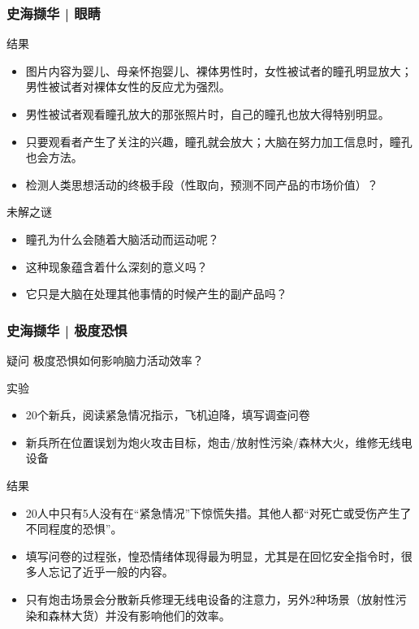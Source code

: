 \begin{frame}
  \frametitle{史海撷华 | 眼睛}
  \begin{block}{结果}
    \begin{itemize}
      \item 图片内容为婴儿、母亲怀抱婴儿、裸体男性时，女性被试者的瞳孔明显放大；男性被试者对裸体女性的反应尤为强烈。
      \item 男性被试者观看瞳孔放大的那张照片时，自己的瞳孔也放大得特别明显。
      \item 只要观看者产生了关注的兴趣，瞳孔就会放大；大脑在努力加工信息时，瞳孔也会方法。
      \item 检测人类思想活动的终极手段（性取向，预测不同产品的市场价值）？
    \end{itemize}
  \end{block}
  \pause
  \begin{block}{未解之谜}
    \begin{itemize}
      \item 瞳孔为什么会随着大脑活动而运动呢？
      \item 这种现象蕴含着什么深刻的意义吗？
      \item 它只是大脑在处理其他事情的时候产生的副产品吗？
    \end{itemize}
  \end{block}
\end{frame}

\begin{frame}
  \frametitle{史海撷华 | 极度恐惧}
  \begin{block}{疑问}
    极度恐惧如何影响脑力活动效率？
  \end{block}
  \vspace{-0.3em}
  \pause
  \begin{block}{实验}
    \begin{itemize}
      \item 20个新兵，阅读紧急情况指示，飞机迫降，填写调查问卷
      \item 新兵所在位置误划为炮火攻击目标，炮击/放射性污染/森林大火，维修无线电设备
    \end{itemize}
  \end{block}
  \vspace{-0.3em}
  \pause
  \begin{block}{结果}
    \begin{itemize}
      \item 20人中只有5人没有在“紧急情况”下惊慌失措。其他人都“对死亡或受伤产生了不同程度的恐惧”。
      \item 填写问卷的过程张，惶恐情绪体现得最为明显，尤其是在回忆安全指令时，很多人忘记了近乎一般的内容。
      \item 只有炮击场景会分散新兵修理无线电设备的注意力，另外2种场景（放射性污染和森林大货）并没有影响他们的效率。
    \end{itemize}
  \end{block}
\end{frame}

